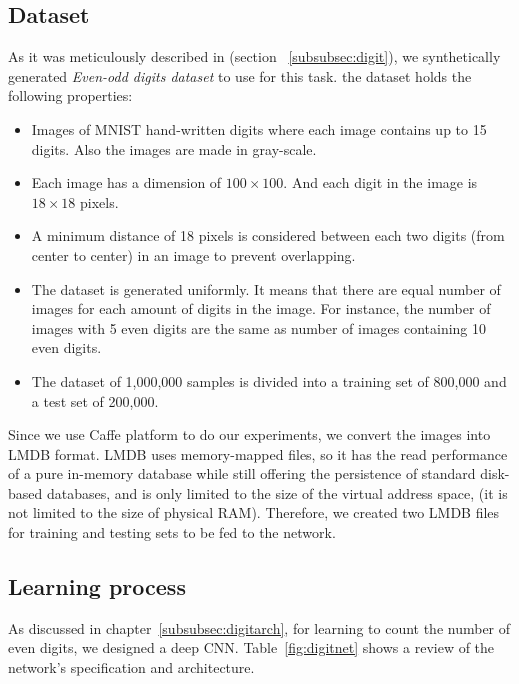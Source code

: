 \subsection{Dataset} 
As it was meticulously described in (section ~\ref{subsubsec:digit}), we synthetically generated \textit{Even-odd digits dataset} to use for this task. the dataset holds the following properties:
\begin{itemize}
\item Images of MNIST hand-written digits where each image contains up to 15 digits. Also the images are made in gray-scale.
\item Each image has a dimension of $100\times100$. And each digit in the image is $18\times18$ pixels.  
\item A minimum distance of 18 pixels is considered between each two digits (from center to center) in an image to prevent overlapping.
\item The dataset is generated uniformly. It means that there are equal number of images for each amount of digits in the image. For instance, the number of images with 5 even digits are the same as number of images containing 10 even digits.
\item The dataset of 1,000,000 samples is divided into a training set of 800,000 and a test set of 200,000. 
\end{itemize}

Since we use Caffe platform to do our experiments, we convert the images into LMDB format. LMDB uses memory-mapped files, so it has the read performance of a pure in-memory database while still offering the persistence of standard disk-based databases, and is only limited to the size of the virtual address space, (it is not limited to the size of physical RAM). Therefore, we created two LMDB files for training and testing sets to be fed to the network.  

\subsection{Learning process}

As discussed in chapter~\ref{subsubsec:digitarch}, for learning to count the number of even digits, we designed a deep CNN. Table~\ref{fig:digitnet} shows a review of the network's specification and architecture.

